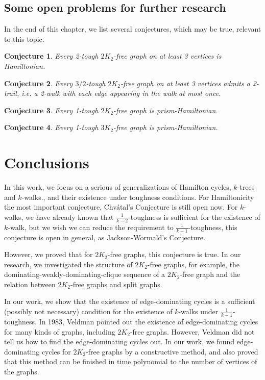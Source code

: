 \documentclass[12pt]{report}
\newtheorem{conjecture}{Conjecture}
\begin{document}
\section{Some open problems for further research}

In the end of this chapter, we list several conjectures, which may be true,  relevant to this topic.

\begin{conjecture}
Every 2-tough $2K_2$-free graph on at least 3 vertices is Hamiltonian.
\end{conjecture}

\begin{conjecture}
Every $3/2$-tough $2K_2$-free graph on at least 3 vertices admits a 2-trail, i.e. a 2-walk with each edge appearing in the walk at most once.
\end{conjecture}

\begin{conjecture}
Every 1-tough $2K_2$-free graph is prism-Hamiltonian.
\end{conjecture}


\begin{conjecture}
Every 1-tough $3K_2$-free graph is prism-Hamiltonian.
\end{conjecture}








\chapter{Conclusions}
In this work, we focus on a serious of generalizations of Hamilton cycles, $k$-trees and $k$-walks., and their existence under toughness conditions.
For Hamiltonicity the most important conjecture, Chv{\'a}tal's Conjecture is still open now. For $k$-walks, we have already known that $\frac{1}{k-2}$-toughness is sufficient for the existence of $k$-walk, but we wish we can reduce the requirement to $\frac{1}{k-1}$-toughness, this conjecture is open in general, as Jackson-Wormald's Conjecture. 

However, we proved that for $2K_2$-free graphs, this conjecture is true. In our research, we investigated the structure of $2K_2$-free graphs, for example, the dominating-weakly-dominating-clique sequence of a $2K_2$-free graph and the relation between $2K_2$-free graphs and split graphs.

In our work, we show that the existence of edge-dominating cycles is a sufficient (possibly not necessary) condition for the existence of $k$-walks under $\frac{1}{k-1}$-toughness. In 1983, Veldman pointed out the existence of edge-dominating cycles for many kinds of graphs, including $2K_2$-free graphs. However, Veldman did not tell us how to find the edge-dominating cycles out. In our work, we found edge-dominating cycles for $2K_2$-free graphs by a constructive method, and also proved that  this method can be finished in time polynomial to the number of vertices of the graphs.
\end{document}
